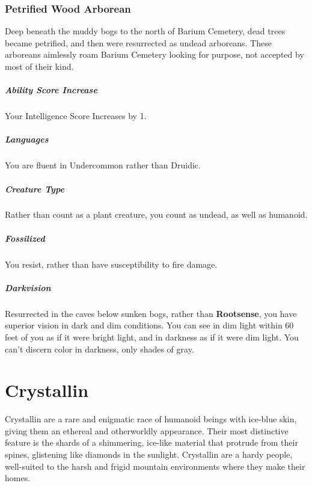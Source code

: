 \subsubsection{Petrified Wood Arborean}
Deep beneath the muddy bogs to the north of Barium Cemetery, dead trees became petrified, and then were resurrected as undead arboreans. These arboreans aimlessly roam Barium Cemetery looking for purpose, not accepted by most of their kind.
\subparagraph{Ability Score Increase}Your Intelligence Score Increases by 1.
\subparagraph{Languages}You are fluent in Undercommon rather than Druidic.
\subparagraph{Creature Type}Rather than count as a plant creature, you count as undead, as well as humanoid.
\subparagraph{Fossilized}You resist, rather than have susceptibility to fire damage.
\subparagraph{Darkvision}Resurrected in the caves below sunken bogs, rather than \textbf{Rootsense}, you have superior vision in dark and dim conditions. You can see in dim light within 60 feet of you as if it were bright light, and in darkness as if it were dim light. You can’t discern color in darkness, only shades of gray.
\raggedbottom
\pagebreak
\section{Crystallin}
Crystallin are a rare and enigmatic race of humanoid beings with ice-blue skin, giving them an ethereal and otherworldly appearance. Their most distinctive feature is the shards of a shimmering, ice-like material that protrude from their spines, glistening like diamonds in the sunlight. Crystallin are a hardy people, well-suited to the harsh and frigid mountain environments where they make their homes.
